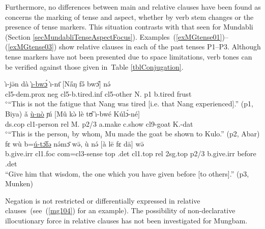 \documentclass[10pt,twoside]{article}
\makeatletter
\newcommand{\cl}[1]{{\sc cl#1}}
\newcommand{\pref}[1]{(\ref{#1})}
\newcommand{\rref}[2]{\pref{#1}--\pref{#2}}
\newcommand{\sref}[1]{Section \ref{#1}}
\newcommand{\tref}[1]{Table \ref{#1}}
\def\elicited{$^\diamond$}
\def\ML#1{#1\symbol{"1DC6}} %
\renewcommand{\i}{ı}
\def\@{ə}
\def\eh{ɛ}
\def\oo{ʊ}
\def\aw{ɔ}
\def\ih{ɩ}
\def\ng{ŋ}
\def\ny{ɲ}
\makeatother
\begin{document}
Furthermore, no differences between
main and relative clauses have been found as concerns the
marking of tense and aspect,
whether by verb stem changes or the presence of tense markers.
This situation contrasts with that seen for Mundabli (\sref{secMundabliTenseAspectFocus}).
Examples~\rref{exMGtense01}{exMGtense03} show relative
clauses in each of the past tenses P1--P3. Although
tense markers have not been presented due to space
limitations, verb tones
can be verified against those given in~\tref{tblConjugation}.
%
\begin{exe}
\ex	\label{exMGtense01}
\gll \`\i-j\={\@}n d\`a \uline{\`\i-bw\'{\aw}} \`\i-n\={\ih} $[$N\H{a}{\ng} f\H{\@} bw\H{\aw}$]$ n\'{\@}	\\
\cl5-{\sc dem.prox} {\sc neg} \cl5-b.tired.{\sc inf} \cl5-other N. {\sc p1} b.tired {\sc frust}	\\
\glt \elicited``This is not the fatigue that Nang was tired [i.e. that Nang experienced].''  ({\sc p1}, Biya) %
%
\ex	\label{exMGtense02}
\gll \v{a} \uline{\`u-n\`o} \ny\'{\i} $[$M\^{u} k\`{\@} l\`e t\^{\oo} \`\i-bw\'{e} K\'ul\'{\aw}-n\'e$]$	\\
{\sc ds.cop} \cl1-person {\sc rel} M. {\sc p2/3}{\footnotemark} a.make c.show \cl9-goat K.-{\sc dat}	\\
\glt \elicited``This is the person$_i$ by whom$_i$ Mu made the goat be shown to Kulo.'' ({\sc p2}, Abar)	%
\ex	\label{exMGtense03}
\gll f\ML{\eh} w\`u b=\uline{\'u-t\H{\aw}f{\@}} n\'{\@}m\={\aw} w\={\@}, \`u n\'{\@} $[$\`a l\=e f\ML{\eh} d\=a$]$ w\={\@} \\
b.give.{\sc irr} \cl1.{\sc foc} {\sc com=}\cl3-sense {\sc top} {\sc \cl3.det} \cl1.{\sc top} {\sc rel} {\sc 2sg.top}
{\sc p2/3} b.give.{\sc irr} before {\sc \cl3.det}	\\ %
\glt ``Give him that wisdom, the one which you have given before [to others].'' ({\sc p3}, Munken) 
\end{exe}
%
%
Negation is not restricted or differentially expressed in relative clauses~(see~\pref{mg104} for an example).
The possibility of non-declarative illocutionary force in relative clauses has not been investigated
for Mungbam.
\end{document}
